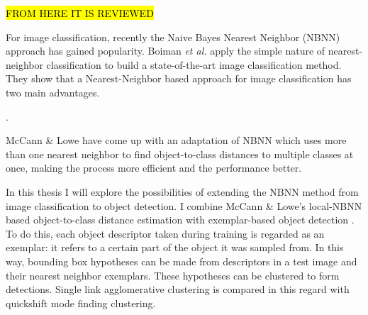 \begin{figure}[hbt]
    \centering
\end{figure}


\hl{FROM HERE IT IS REVIEWED}

For image classification, recently the Naive Bayes Nearest Neighbor (NBNN) \cite{boiman2008defense} approach has gained popularity.  Boiman \emph{et al.} apply the simple nature of nearest-neighbor classification to build a state-of-the-art image classification method. They show that a Nearest-Neighbor based approach for image classification has two main advantages.

.

McCann \& Lowe \cite{mccann2012local} have come up with an adaptation of NBNN which uses more than one nearest neighbor to find object-to-class distances to multiple classes at once, making the process more efficient and the performance better. 

In this thesis I will explore the possibilities of extending the NBNN method from image classification to object detection. I combine McCann \& Lowe's local-NBNN based object-to-class distance estimation with exemplar-based object detection \cite{becker2012codebook, chum2007exemplar}. To do this, each object descriptor taken during training is regarded as an exemplar: it refers to a certain part of the object it was sampled from. In this way, bounding box hypotheses can be made from descriptors in a test image and their nearest neighbor exemplars. These hypotheses can be clustered to form detections. Single link agglomerative clustering is compared in this regard with quickshift mode finding clustering.

